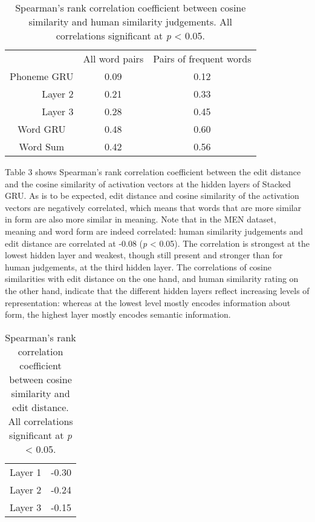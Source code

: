 \begin{table}[]
	\centering
	\begin{tabular}{ccc}
		& All word pairs & Pairs of frequent words \\
		{\sc Phoneme GRU} 
		\multicolumn{1}{|r|}{Layer 1} & 0.09 & 0.12\\
		\multicolumn{1}{|r|}{Layer 2} & 0.21 & 0.33 \\
		\multicolumn{1}{|r|}{Layer 3}& 0.28 & 0.45 \\
		\hline
		{\sc Word GRU} & 0.48 & 0.60\\
		\hline
		{\sc Word Sum} & 0.42 & 0.56
	\end{tabular}
	\caption{Spearman's rank correlation coefficient between cosine similarity and human similarity judgements. All correlations significant at \textit{p} < 0.05.} %
\end{table}

Table 3 shows Spearman's rank correlation coefficient between the edit distance and the cosine similarity of activation vectors at the hidden layers of {\sc Stacked GRU}.
As is to be expected, edit distance and cosine similarity of the activation vectors are negatively correlated, which means that words that are more similar in form are also more similar in meaning. Note that in the MEN dataset, meaning and word form are indeed correlated: human similarity judgements and edit distance are correlated at -0.08 (\textit{p} < 0.05). The correlation is strongest at the lowest hidden layer and weakest, though still present and stronger than for human judgements, at the third hidden layer. 
The correlations of cosine similarities with edit distance on the one hand, and human similarity rating on the other hand, indicate that the different hidden layers reflect increasing levels of representation: whereas at the lowest level mostly encodes information about form, the highest layer mostly encodes semantic information.

\begin{table}[]
	\centering
	\begin{tabular}{cc}
		Layer 1 & -0.30 \\
		Layer 2 & -0.24 \\
		Layer 3 & -0.15
	\end{tabular}
	\caption{Spearman's rank correlation coefficient between cosine similarity and edit distance. All correlations significant at \textit{p} < 0.05.} %
\end{table}

